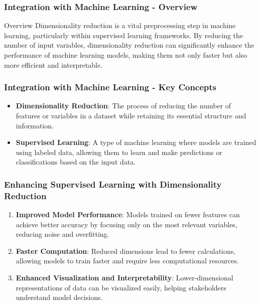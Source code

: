 \documentclass[aspectratio=169]{beamer}
\begin{document}
\begin{frame}[fragile]
    \frametitle{Integration with Machine Learning - Overview}
    \begin{block}{Overview}
        Dimensionality reduction is a vital preprocessing step in machine learning, particularly within supervised learning frameworks. By reducing the number of input variables, dimensionality reduction can significantly enhance the performance of machine learning models, making them not only faster but also more efficient and interpretable.
    \end{block}
\end{frame}

\begin{frame}[fragile]
    \frametitle{Integration with Machine Learning - Key Concepts}
    \begin{itemize}
        \item \textbf{Dimensionality Reduction}: The process of reducing the number of features or variables in a dataset while retaining its essential structure and information.
        \item \textbf{Supervised Learning}: A type of machine learning where models are trained using labeled data, allowing them to learn and make predictions or classifications based on the input data.
    \end{itemize}
\end{frame}

\begin{frame}[fragile]
    \frametitle{Enhancing Supervised Learning with Dimensionality Reduction}
    \begin{enumerate}
        \item \textbf{Improved Model Performance}: Models trained on fewer features can achieve better accuracy by focusing only on the most relevant variables, reducing noise and overfitting.
        \item \textbf{Faster Computation}: Reduced dimensions lead to fewer calculations, allowing models to train faster and require less computational resources.
        \item \textbf{Enhanced Visualization and Interpretability}: Lower-dimensional representations of data can be visualized easily, helping stakeholders understand model decisions.
    \end{enumerate}
\end{frame}
\end{document}
